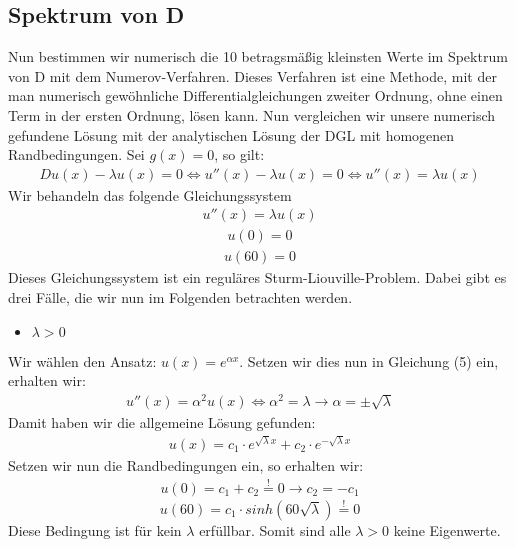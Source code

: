 \documentclass[ngerman]{scrartcl}
\begin{document}
\subsection{Spektrum von D}
Nun bestimmen wir numerisch die 10 betragsmäßig kleinsten Werte im Spektrum von D mit dem Numerov-Verfahren. Dieses Verfahren ist eine Methode, mit der man numerisch gewöhnliche Differentialgleichungen zweiter Ordnung, ohne einen Term in der ersten Ordnung, lösen kann. \newline
Nun vergleichen wir unsere numerisch gefundene Lösung mit der analytischen Lösung der DGL mit homogenen Randbedingungen. \newline Sei $g(x) = 0$, so gilt: 
\begin{align}
D u(x) - \lambda u(x) = 0 \Leftrightarrow u''(x) - \lambda u(x) = 0 \Leftrightarrow u''(x) = \lambda u(x)
\end{align}
Wir behandeln das folgende Gleichungssystem
\begin{align}
u''(x) = \lambda u(x)
\end{align}
\begin{align}
u(0) = 0
\end{align}
\begin{align}
u(60) = 0
\end{align}
Dieses Gleichungssystem ist ein reguläres Sturm-Liouville-Problem. Dabei gibt es drei Fälle, die wir nun im Folgenden betrachten werden.
\begin{itemize}
	\item $\lambda > 0$
\end{itemize}
Wir wählen den Ansatz: $u(x) = e^{\alpha x}$. Setzen wir dies nun in Gleichung (5) ein, erhalten wir: 
\begin{align}
u''(x) = \alpha^2 u(x) \Leftrightarrow \alpha^2 = \lambda \rightarrow \alpha = \pm \sqrt{\lambda}
\end{align}
Damit haben wir die allgemeine Lösung gefunden: 
\begin{align}
u(x) = c_1 \cdot e^{\sqrt{\lambda} x} + c_2 \cdot e^{-\sqrt{\lambda} x}
\end{align}
Setzen wir nun die Randbedingungen ein, so erhalten wir: 
\begin{align}
u(0) = c_1 + c_2 \overset{!}{=} 0 \rightarrow c_2 = - c_1
\end{align}
\begin{equation}
u(60) = c_1 \cdot sinh(60 \sqrt{\lambda}) \overset{!}{=} 0
\end{equation}
Diese Bedingung ist für kein $\lambda$ erfüllbar. Somit sind alle $\lambda > 0$ keine Eigenwerte. 
\end{document}
